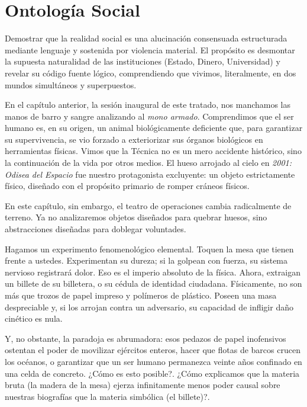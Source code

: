 \chapter{Ontología Social}
\label{cap:ontologia_social}

\begin{objetivo}
Demostrar que la realidad social es una alucinación consensuada estructurada mediante lenguaje y sostenida por violencia material. El propósito es desmontar la supuesta naturalidad de las instituciones (Estado, Dinero, Universidad) y revelar su código fuente lógico, comprendiendo que vivimos, literalmente, en dos mundos simultáneos y superpuestos.
\end{objetivo}

En el capítulo anterior, la sesión inaugural de este tratado, nos manchamos las manos de barro y sangre analizando al \textit{mono armado}. Comprendimos que el ser humano es, en su origen, un animal biológicamente deficiente que, para garantizar su supervivencia, se vio forzado a exteriorizar sus órganos biológicos en herramientas físicas. Vimos que la Técnica no es un mero accidente histórico, sino la continuación de la vida por otros medios. El hueso arrojado al cielo en \textit{2001: Odisea del Espacio} fue nuestro protagonista excluyente: un objeto estrictamente físico, diseñado con el propósito primario de romper cráneos físicos. 

En este capítulo, sin embargo, el teatro de operaciones cambia radicalmente de terreno. Ya no analizaremos objetos diseñados para quebrar huesos, sino abstracciones diseñadas para doblegar voluntades. 

Hagamos un experimento fenomenológico elemental. Toquen la mesa que tienen frente a ustedes. Experimentan su dureza; si la golpean con fuerza, su sistema nervioso registrará dolor. Eso es el imperio absoluto de la física. Ahora, extraigan un billete de su billetera, o su cédula de identidad ciudadana. Físicamente, no son más que trozos de papel impreso y polímeros de plástico. Poseen una masa despreciable y, si los arrojan contra un adversario, su capacidad de infligir daño cinético es nula. 

Y, no obstante, la paradoja es abrumadora: esos pedazos de papel inofensivos ostentan el poder de movilizar ejércitos enteros, hacer que flotas de barcos crucen los océanos, o garantizar que un ser humano permanezca veinte años confinado en una celda de concreto. ¿Cómo es esto posible?. ¿Cómo explicamos que la materia bruta (la madera de la mesa) ejerza infinitamente menos poder causal sobre nuestras biografías que la materia simbólica (el billete)?.

